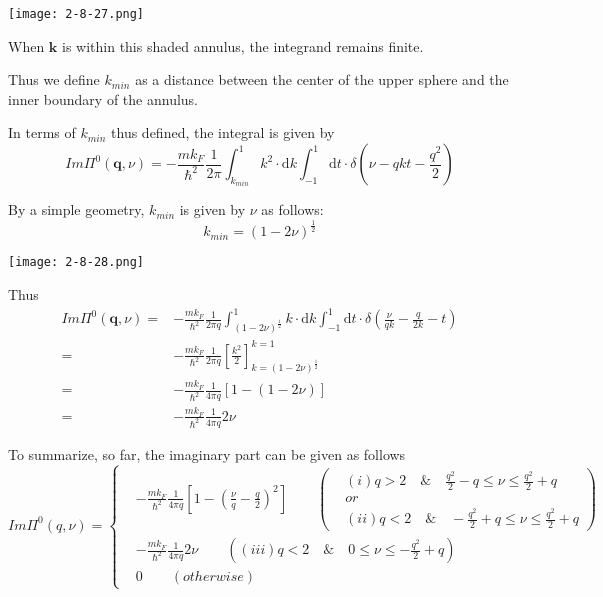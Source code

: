 \begin{center}\label{Fig2.8.27}
\texttt{[image: 2-8-27.png]}
\end{center}

When $\mathbf{k}$ is within this shaded annulus, the integrand remains finite.

Thus we define $k_{min}$ as a distance between the center of the upper sphere and the inner boundary of the annulus.

In terms of $k_{min}$ thus defined, the integral is given by
\[ Im\Pi^0(\mathbf{q},\nu) = - \frac{m k_F}{\hbar^2}\frac{1}{2\pi} \int_{k_{min}}^1 k^2  \cdot \mathrm{d} k \int_{-1}^1 \mathrm{d} t \cdot \delta(\nu-qkt-\frac{q^2}{2})\]

By a simple geometry, $k_{min}$ is given by $\nu$ as follows:
\[ k_{min} = (1-2\nu)^{\frac{1}{2}} \]
\begin{center}\label{Fig2.8.28}
\texttt{[image: 2-8-28.png]}
\end{center}

Thus
\begin{equation} \label{Eqs2.8.23} \begin{split}
 Im\Pi^0(\mathbf{q},\nu) =& - \frac{m k_F}{\hbar^2}\frac{1}{2\pi q} \int_{(1-2\nu)^{\frac{1}{2}}}^1 k  \cdot \mathrm{d} k \int_{-1}^1 \mathrm{d} t \cdot \delta(\frac{\nu}{qk}-\frac{q}{2 k}-t)\\
=& - \frac{m k_F}{\hbar^2}\frac{1}{2\pi q} \left[ \frac{k^2}{2} \right]_{k=(1-2\nu)^{\frac{1}{2}}}^{k=1}\\
=& - \frac{m k_F}{\hbar^2}\frac{1}{4\pi q} \left[ 1 - (1-2\nu) \right]\\
=& - \frac{m k_F}{\hbar^2}\frac{1}{4\pi q} 2\nu
\end{split}\end{equation}

To summarize, so far, the imaginary part can be given as follows
\begin{equation} \label{Eqs2.8.24}
Im \Pi^0(q,\nu) = \left\{ \begin{split}
&-\frac{m k_F}{\hbar^2} \frac{1}{4\pi q} \left[ 1-\left( \frac{\nu}{q} - \frac{q}{2} \right)^2 \right] \qquad \left( \begin{split}
&(i) q > 2 \quad\&\quad \frac{q^2}{2} - q\leq \nu \leq \frac{q^2}{2} + q\\
&or\\
&(ii) q < 2 \quad\&\quad -\frac{q^2}{2} + q \leq \nu \leq \frac{q^2}{2} + q
\end{split}  \right)\\
&-\frac{m k_F}{\hbar^2} \frac{1}{4\pi q} 2\nu \qquad 
\left( (iii) q < 2 \quad\&\quad 0 \leq \nu \leq -\frac{q^2}{2}+q \right)\\
&0\qquad  (otherwise)
\end{split} \right.
\end{equation}

